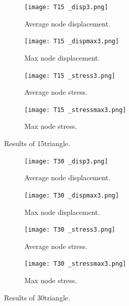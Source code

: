 \documentclass[../main.tex]{subfiles}
\begin{document}
\begin{figure}[h!]
  \centering 
  \begin{subfigure}[b]{0.45\textwidth}
    \centering 
    \texttt{[image: T15 \_disp3.png]}
    \caption{Average node displacement.}
    \label{}
  \end{subfigure}
  \begin{subfigure}[b]{0.45\textwidth}
    \centering 
    \texttt{[image: T15 \_dispmax3.png]}
    \caption{Max node displacement.}
    \label{}
  \end{subfigure}
  \begin{subfigure}[b]{0.45\textwidth}
    \centering 
    \texttt{[image: T15 \_stress3.png]}
    \caption{Average node stress.}
    \label{}
  \end{subfigure}
  \begin{subfigure}[b]{0.45\textwidth}
    \centering 
    \texttt{[image: T15 \_stressmax3.png]}
    \caption{Max node stress.}
    \label{}
  \end{subfigure}
  \caption{Results of 15\degree triangle.}
\end{figure}

\begin{figure}
  \centering 
  \begin{subfigure}[b]{0.45\textwidth}
    \centering 
    \texttt{[image: T30 \_disp3.png]}
    \caption{Average node displacement.}
    \label{}
  \end{subfigure}
  \begin{subfigure}[b]{0.45\textwidth}
    \centering 
    \texttt{[image: T30 \_dispmax3.png]}
    \caption{Max node displacement.}
    \label{}
  \end{subfigure}
  \begin{subfigure}[b]{0.45\textwidth}
    \centering 
    \texttt{[image: T30 \_stress3.png]}
    \caption{Average node stress.}
    \label{}
  \end{subfigure}
  \begin{subfigure}[b]{0.45\textwidth}
    \centering 
    \texttt{[image: T30 \_stressmax3.png]}
    \caption{Max node stress.}
    \label{}
  \end{subfigure}
  \caption{Results of 30\degree triangle.}
\end{figure}
\end{document}
